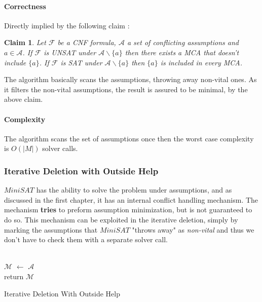 \documentclass[]{article}
\newtheorem{claim}  {Claim}
\newcommand{\msat}[0]{$MiniSAT$ }
\begin{document}
		\paragraph{Correctness} Directly implied by the following claim :
		\begin{claim}
			Let $ \mathcal{F} $ be a CNF formula, $ \mathcal{A} $ a set of conflicting assumptions and $  a \in \mathcal{A} $. If $ \mathcal{F} $ is UNSAT under $ \mathcal{A} \backslash \{a\} $ then there exists a MCA that doesn't include $ \{a\} $. If $ \mathcal{F} $ is SAT under $ \mathcal{A} \backslash \{a\} $ then $ \{a\} $ is included in every MCA.
		\end{claim}
		The algorithm basically scans the assumptions, throwing away non-vital ones. As it filters the non-vital assumptions, the result is assured to be minimal, by the above claim.
		\paragraph{Complexity} The algorithm scans the set of assumptions once then the worst case complexity is $ O \left( | M | \right)  $ solver calls.
		
		\subsubsection{Iterative Deletion with Outside Help}
		\msat has the ability to solve the problem under assumptions, and as discussed in the first chapter, it has an internal conflict handling mechanism. The mechanism \textbf{tries} to preform assumption minimization, but is not guaranteed to do so. This mechanism can be exploited in the iterative deletion, simply by marking the assumptions that \msat "throws away" as \textit{non-vital} and thus we don't have to check them with a separate solver call.\\\\
			\begin{algorithm}[H]
				$ \mathcal{M} $ $\leftarrow$ $ \mathcal{A} $\\
				return $ \mathcal{M} $
				\caption{Iterative Deletion With Outside Help}
			\end{algorithm}
		
\end{document}
